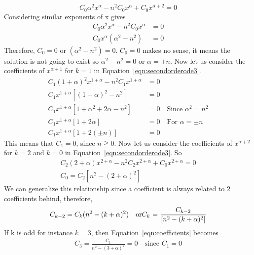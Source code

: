 \[
C_0 \alpha^2 x^\alpha - n^2C_0 x^\alpha + C_0 x^{\alpha + 2} =0
\]
Considering similar exponents of x gives 
\begin{align*}
C_0 \alpha^2 x^\alpha - n^2C_0 x^\alpha &=0\\
C_0 x^\alpha(\alpha^2 -n^2) &=0
\end{align*}
Therefore, $C_0 =0$ or $(\alpha^2 -n^2) =0$. $C_0 =0$ makes no sense, it means the solution is not going to exist so  $\alpha^2 -n^2 =0$ or  $\alpha =\pm n$. Now let us consider the coefficients of $x^{\alpha + 1}$ for $k=1$ in Equation~\eqref{eqn:secondorderode3}.
\begin{align*}
C_1(1 + \alpha)^2 x^{1 + \alpha} - n^2 C_1 x^{1 + \alpha} &= 0\\
C_1x^{1 + \alpha}[(1 + \alpha)^2 - n^2] &= 0\\
C_1x^{1 + \alpha}[1 + \alpha^2 + 2\alpha - n^2] &=0\quad\text{Since }\alpha^2 = n^2\\
C_1x^{1 + \alpha}[1 + 2\alpha] &=0\quad\text{For }\alpha =\pm n\\
C_1x^{1 + \alpha}[1 + 2(\pm n)] &= 0
\end{align*}
This means that $C_1 = 0$, since $n \geqq 0$. Now let us consider the coefficients of $x^{\alpha + 2}$ for $k=2$ and $k=0$ in Equation~\eqref{eqn:secondorderode3}.
So 
\begin{align*}
C_2(2 + \alpha) x^{2 + \alpha} - n^2 C_2x^{2 + \alpha} + C_0x^{2 + \alpha} = 0\\
C_0 = C_2[n^2 - (2 + \alpha)^2]
\end{align*}
We can generalize this relationship since a coefficient is always related to 2 coefficients behind, therefore,
\begin{dmath}
C_{k-2} = C_k (n^2 - (k + \alpha)^2)\quad\text{or}\\
C_k\text{ = }\frac{C_{k-2}}{[n^2 - (k + \alpha)^2]}
\label{eqn:coefficients}
\end{dmath}
If k is odd for instance $k = 3$, then Equation~\eqref{eqn:coefficients} becomes
\begin{align*}
C_3 = \frac{C_{1}}{n^2 - (3 + \alpha)^2} = 0\quad\text{since }C_1 = 0
\end{align*} 

